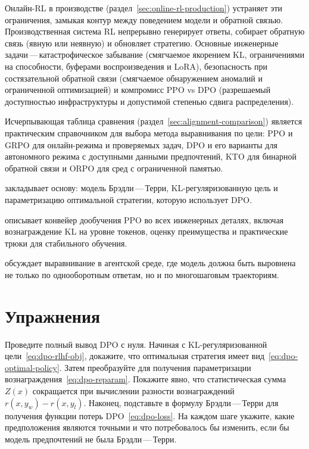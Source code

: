 Онлайн-RL в производстве (раздел~\ref{sec:online-rl-production}) устраняет эти ограничения, замыкая контур между поведением модели и обратной связью. Производственная система RL непрерывно генерирует ответы, собирает обратную связь (явную или неявную) и обновляет стратегию. Основные инженерные задачи\,---\,катастрофическое забывание (смягчаемое якорением KL, ограничениями на способности, буферами воспроизведения и LoRA), безопасность при состязательной обратной связи (смягчаемое обнаружением аномалий и ограниченной оптимизацией) и компромисс PPO vs DPO (разрешаемый доступностью инфраструктуры и допустимой степенью сдвига распределения).

Исчерпывающая таблица сравнения (раздел~\ref{sec:alignment-comparison}) является практическим справочником для выбора метода выравнивания по цели: PPO и GRPO для онлайн-режима и проверяемых задач, DPO и его варианты для автономного режима с доступными данными предпочтений, KTO для бинарной обратной связи и ORPO для сред с ограниченной памятью.

\begin{description}[leftmargin=!,labelwidth=3.5cm]
  \item[Глава~\ref{ch:reward-models}] закладывает основу: модель Брэдли\,---\,Терри, KL-регуляризованную цель и параметризацию оптимальной стратегии, которую использует DPO.
  \item[Глава~\ref{ch:practical-rlhf}] описывает конвейер дообучения PPO во всех инженерных деталях, включая вознаграждение KL на уровне токенов, оценку преимущества и практические трюки для стабильного обучения.
  \item[Глава~\ref{ch:agents}] обсуждает выравнивание в агентской среде, где модель должна быть выровнена не только по однооборотным ответам, но и по многошаговым траекториям.
\end{description}

\section*{Упражнения}

\begin{exercise}
\label{ex:dpo-derivation}
Проведите полный вывод DPO с нуля. Начиная с KL-регуляризованной цели~\eqref{eq:dpo-rlhf-obj}, докажите, что оптимальная стратегия имеет вид~\eqref{eq:dpo-optimal-policy}. Затем преобразуйте для получения параметризации вознаграждения~\eqref{eq:dpo-reparam}. Покажите явно, что статистическая сумма $Z(x)$ сокращается при вычислении разности вознаграждений $r(x, y_w) - r(x, y_l)$. Наконец, подставьте в формулу Брэдли\,---\,Терри для получения функции потерь DPO~\eqref{eq:dpo-loss}. На каждом шаге укажите, какие предположения являются точными и что потребовалось бы изменить, если бы модель предпочтений не была Брэдли\,---\,Терри.
\end{exercise}

